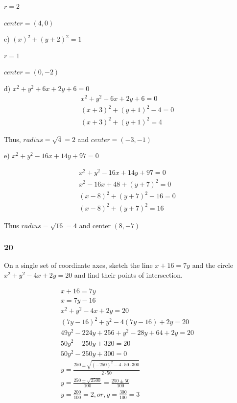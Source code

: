 \documentclass[]{report}
\begin{document}
$r = 2$

$center = (4, 0)$


c) $(x )^2 + (y + 2) ^2 = 1$

$r = 1$

$center = (0, -2)$


d) $x^2 + y^2 + 6x + 2y + 6  = 0$
\begin{align*}
	x^2 + y^2 + 6x + 2y + 6  = 0 \tag{1} \\
	(x + 3)^2 + (y+1)^2  -4 = 0  \tag{factoring out x and y} \\
	(x + 3)^2 + (y+1)^2 = 4
\end{align*}

Thus, $radius = \sqrt{4} = 2$ and $center = (-3, -1)$

e) $x^2 + y^2 - 16x + 14y + 97 = 0$

\begin{align*}
x^2 + y^2 - 16x + 14y + 97 = 0	\tag{1} \\
x^2 - 16x + 48 + (y + 7)^2 = 0 \tag{factoring out y}\\
(x-8)^2 + (y+7)^2 - 16 = 0 \tag{factoring out x} \\
(x-8)^2 + (y+7)^2 = 16
\end{align*}

Thus $radius = \sqrt{16} = 4$ and center $(8, -7)$

\subsubsection{20}

On a single set of coordinate axes, sketch the line $x + 16 = 7y$ and the circle $x^2 + y^2 - 4x + 2y = 20$ and find their points of intersection.

\begin{align*}
	x + 16 = 7y \tag{1} \\
	x = 7y - 16 \tag{rearranging} \\
	x^2 + y^2 - 4x + 2y = 20  \tag{2} \\
	(7y - 16)^2 + y^2 - 4(7y -16) + 2y = 20 \tag{eliminating x} \\
	49y^2 - 224y + 256 + y^2 - 28y  + 64 + 2y = 20 \tag{expanding} \\
	50y^2 - 250y + 320 = 20 \\
	50y^2 - 250y + 300 = 0 \\
	y = \frac{250 \pm \sqrt{(-250)^2 - 4 \cdot 50 \cdot 300}}{2 \cdot 50} \\
	y = \frac{250 \pm \sqrt{2500}}{100} = \frac{250 \pm 50}{100}\\
	y = \frac{200}{100} = 2, or, y = \frac{300}{100} = 3
\end{align*}
\end{document}
